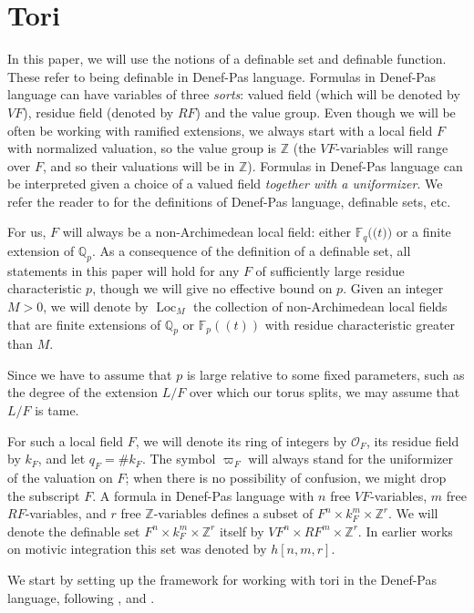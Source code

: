 \documentclass{amsart}
\newcommand{\Q}{{\mathbb Q}}
\newcommand{\F}{{\mathbb F}}
\newcommand{\Z}{{\mathbb Z}}
\newcommand{\ri}{\mathcal{O}}
\newcommand{\loc}{\operatorname{Loc}}
\def\llp{\mathopen{(\!(}}
\def\rrp{\mathopen{)\!)}}
\theoremstyle{plain}
\theoremstyle{definition}
\begin{document}
\section{Tori} 
In this paper, we will use the notions of a definable set and  definable function. These refer to being definable in Denef-Pas language. 
Formulas in Denef-Pas language can have variables of three \emph{sorts}: valued field (which will be denoted by $VF$), residue field (denoted by $RF$) and the value group. Even though we will be often be working with ramified extensions, we always start with a local field $F$ with normalized valuation, so the value group is $\Z$ (the $VF$-variables will range over $F$, and so their valuations will be in $\Z$).
Formulas in Denef-Pas language can be interpreted given a choice of a valued field \emph{together with a uniformizer}. 
We refer the reader to \cite{what's the best ref?} for the definitions of Denef-Pas language, definable sets, etc. 

For us, $F$ will always be a non-Archimedean local field: either $\F_q\llp t\rrp$ or a finite extension of $\Q_p$.
As a consequence of the definition of a definable set, all statements in this paper will hold for any $F$ of sufficiently large residue characteristic $p$, 
though we will give no effective bound on $p$. 
Given an integer $M>0$, we will denote by $\loc_M$ the collection of non-Archimedean local fields that are finite extensions of $\Q_p$ or $\F_p((t))$ with residue characteristic greater than $M$. 

Since we have to assume that $p$ is large relative to some fixed parameters, such as the degree of the extension $L/F$ over which our torus splits, we may assume that $L/F$ is tame.  

For such a local field $F$, we will denote its ring of integers by $\ri_F$, its residue field by $k_F$, and let $q_F=\# k_F$. The symbol $\varpi_F$ will always stand for the uniformizer of the valuation on $F$; when there is no possibility of confusion, we might drop the subscript $F$. 
A formula in Denef-Pas language  with $n$ free $VF$-variables, $m$ free $RF$-variables, and $r$ free 
$\Z$-variables 
defines a subset of $F^n\times k_F^m \times \Z^r$. 
We will denote the definable set $F^n\times k_F^m \times \Z^r$ itself by $VF^n\times RF^m\times \Z^r$. In earlier works on motivic integration this set was denoted by $h[n,m,r]$. 

We start by setting up the framework for working with tori in the Denef-Pas language, following \cite{cluckers-hales-loeser}, \cite{CGH-2} and \cite{hales:transfert}.
\end{document}
